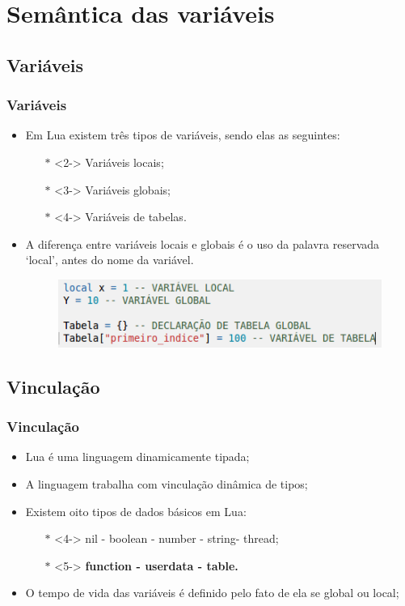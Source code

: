 \documentclass{beamer}
\begin{document}
\section{Semântica das variáveis}
\subsection{Variáveis}
\begin{frame}[fragile]
\frametitle{Variáveis}
	\begin{itemize}
	\item <1-> Em Lua existem três tipos de variáveis, sendo elas as seguintes:
	\begin{itemize}
		\item [$\mathbb{*}$]<2-> Variáveis locais;
		\item [$\mathbb{*}$]<3-> Variáveis globais;
		\item [$\mathbb{*}$]<4-> Variáveis de tabelas.
	\end{itemize}
	\item <5-> A diferença entre variáveis locais e globais é o uso da palavra reservada ‘local’, antes do nome da variável.
	\begin{figure}[H]
	\centering
		\includegraphics[width=0.7\linewidth]{imagens/variaveis}
	\end{figure}
	\end{itemize}
\end{frame}

\subsection{Vinculação}
\begin{frame}[fragile]
\frametitle{Vinculação}
	\begin{itemize}
	\item<1-> Lua é uma linguagem dinamicamente tipada; 
	\item<2-> A linguagem trabalha com vinculação dinâmica de tipos;
	\item<3-> Existem oito tipos de dados básicos em Lua:
	\begin{itemize}
		\item[$\mathbb{*}$]<4-> nil - boolean - number - string- thread;
		\item[$\mathbb{*}$]<5-> \textbf{function - userdata - table.}
	\end{itemize}
	\item<6-> O tempo de vida das variáveis é definido pelo fato de ela se global ou local;
	\end{itemize}
\end{frame}
\end{document}
